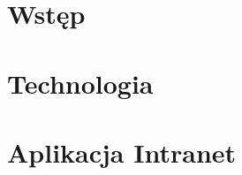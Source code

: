 \documentclass[a4paper, 12pt, twoside]{book}
\begin{document}
\frontmatter %
\begin{titlepage}

\end{titlepage}

\tableofcontents
\lstlistoflistings

\mainmatter %
\chapter{Wstęp}


\chapter{Technologia}


\chapter{Aplikacja Intranet}

\backmatter


\end{document}
